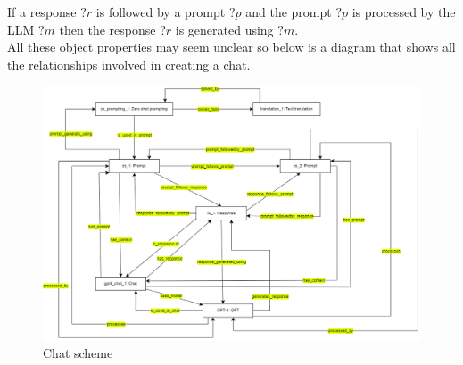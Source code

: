 If a response $?r$ is followed by a prompt $?p$ and the prompt $?p$ is processed by the LLM $?m$ then the response $?r$ is generated using $?m$.\\
All these object properties may seem unclear so below is a diagram that shows all the relationships involved in creating a chat.
\begin{figure}[H]
    \centering
    \includegraphics[width=0.85\linewidth]{Figures/fig_31.png}
    \caption{Chat scheme}
    \label{fig:enter-label}
\end{figure}


